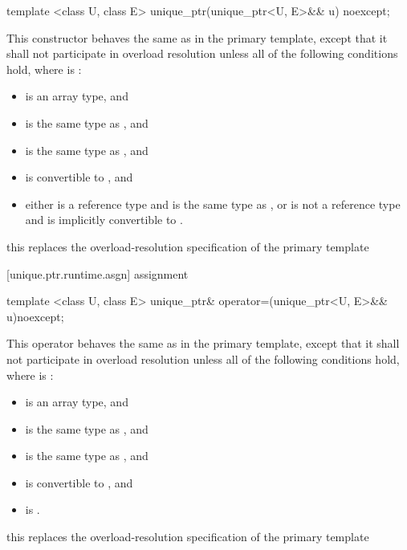 %
\begin{itemdecl}
template <class U, class E>
  unique_ptr(unique_ptr<U, E>&& u) noexcept;
\end{itemdecl}

\begin{itemdescr}
\pnum
This constructor behaves the same as in the primary template,
except that it shall not participate in overload resolution
unless all of the following conditions hold,
where  is :

\begin{itemize}
\item {} is an array type, and
\item {} is the same type as , and
\item {} is the same type as , and
\item {} is convertible to , and
\item either  is a reference type and  is the same type as ,
      or  is not a reference type and  is implicitly convertible to .
\end{itemize}

\begin{note}
this replaces the overload-resolution specification of the primary template
\end{note}
\end{itemdescr}

[unique.ptr.runtime.asgn]{ assignment}

%
\begin{itemdecl}
template <class U, class E>
  unique_ptr& operator=(unique_ptr<U, E>&& u)noexcept;
\end{itemdecl}

\begin{itemdescr}
\pnum
This operator behaves the same as in the primary template,
except that it shall not participate in overload resolution
unless all of the following conditions hold,
where  is :

\begin{itemize}
\item {} is an array type, and
\item {} is the same type as , and
\item {} is the same type as , and
\item {} is convertible to , and
\item {} is .
\end{itemize}

\begin{note}
this replaces the overload-resolution specification of the primary template
\end{note}
\end{itemdescr}

